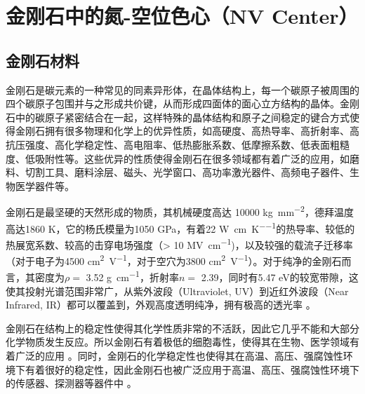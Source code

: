 \documentclass[type = bachelor]{whu-thesis}
\begin{document}

\chapter{金刚石中的氮-空位色心（NV Center）}

\section{金刚石材料}
金刚石是碳元素的一种常见的同素异形体，在晶体结构上，每一个碳原子被周围的四个碳原子包围并与之形成共价键，从而形成四面体的面心立方结构的晶体。金刚石中的碳原子紧密结合在一起，这样特殊的晶体结构和原子之间稳定的键合方式使得金刚石拥有很多物理和化学上的优异性质，如高硬度、高热导率、高折射率、高抗压强度、高化学稳定性、高电阻率、低热膨胀系数、低摩擦系数、低表面粗糙度、低吸附性等。这些优异的性质使得金刚石在很多领域都有着广泛的应用，如磨料、切割工具、磨料涂层、磁头、光学窗口、高功率激光器件、高频电子器件、生物医学器件等。

金刚石是最坚硬的天然形成的物质，其机械硬度高达 10000 \unit{\kilogram\per\milli\meter\squared}，德拜温度高达1860 \unit{\kelvin}，它的杨氏模量为1050 \unit{\GPa}，有着22 \unit{\watt\per\centi\meter\per\kelvin}的热导率、较低的热展宽系数、较高的击穿电场强度（> 10 \unit{\mega\volt\per\centi\meter})，以及较强的载流子迁移率（对于电子为4500 \unit{\centi\meter\squared\per\volt}，对于空穴为3800 \unit{\centi\meter\squared\per\volt}）。对于纯净的金刚石而言，其密度为$\rho =$ 3.52 \unit{\g\per\cm}，折射率$n =$ 2.39，同时有5.47 \unit{\electronvolt}的较宽带隙，这使其投射光谱范围非常广，从紫外波段（Ultraviolet, UV）到近红外波段（Near Infrared, IR）都可以覆盖到，外观高度透明纯净，拥有极高的透光率 \cite{mildren2013optical, lonvcar2013quantum}。

金刚石在结构上的稳定性使得其化学性质非常的不活跃，因此它几乎不能和大部分化学物质发生反应。所以金刚石有着极低的细胞毒性，使得其在生物、医学领域有着广泛的应用 \cite{schirhagl2014nitrogen,wu2016diamond}。同时，金刚石的化学稳定性也使得其在高温、高压、强腐蚀性环境下有着很好的稳定性，因此金刚石也被广泛应用于高温、高压、强腐蚀性环境下的传感器、探测器等器件中 \cite{umezawa2012high, jayaraman1983diamond}。
\end{document}
